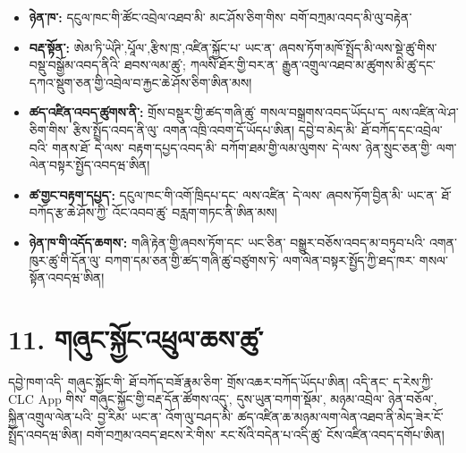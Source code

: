 \documentclass[11pt]{article}
\begin{document}
\begin{itemize}[leftmargin=*]
\item \textbf{ཉེན་ཁ་:} དངུལ་ཁང་གི་ཚོང་འབྲེལ་འཐབ་མི་ མང་ཤོས་ཅིག་གིས་ བགོ་བཀྲམ་འབད་མི་ལུ་བརྟེན་
\item \textbf{བརྡ་སྟོན་:} ཨེམ་ཏི་ཡེཊི་,པཱོལ་,རྩིས་ཁྲ་,འཛིན་སྐྱོང་པ་ ཡང་ན་ ཞབས་ཏོག་མཁོ་སྤྲོད་མི་ལས་སྡེ་ཚུ་གིས་ བསྡུ་བསྒྱོམ་འབད་ནིའི་ ཐབས་ལམ་ཚུ་; ཀལསི་ཐོར་གྱི་བར་ན་ རྒྱུན་འགྲུལ་འཐབ་མ་ཚུགས་མི་ཚུ་དང་ དཀའ་སྡུག་ཅན་གྱི་འབྲེལ་བ་རྐྱང་ཆེ་ཤོས་ཅིག་ཨིན་མས།
\item \textbf{ཚད་འཛིན་འབད་ཚུགས་ནི་:} གྲོས་བསྡུར་གྱི་ཚད་གཞི་ཚུ་ གསལ་བསྒྲགས་འབད་ཡོདཔ་ད་ ལས་འཛིན་ལེ་ཤ་ཅིག་གིས་ རྩིས་སྤྲོད་འབད་ནི་ལུ་ འགན་འཁྲི་འབག་དོ་ཡོདཔ་ཨིན། དབྱེ་བ་མེད་མི་ ཐོ་བཀོད་དང་འབྲེལ་བའི་ གནས་ཐོ་ དེ་ལས་ བརྟག་དཔྱད་འབད་མི་ བཀོག་ཐམ་གྱི་ལམ་ལུགས་ དེ་ལས་ ཉེན་སྲུང་ཅན་གྱི་ ལག་ལེན་བསྟར་སྤྱོད་འབདཝ་ཨིན།
\item \textbf{ཚ་གྱང་བརྟག་དཔྱད་:} དངུལ་ཁང་གི་འགོ་ཁྲིདཔ་དང་ ལས་འཛིན་ དེ་ལས་ ཞབས་ཏོག་བྱིན་མི་ ཡང་ན་ ཐོ་བཀོད་རྩ་ཆེ་ཤོས་ཀྱི་ འོང་འབབ་ཚུ་ བརླག་གཏང་ནི་ཨིན་མས།
\item \textbf{ཉེན་ཁ་གི་འདོད་ཆགས་:} གཞི་རྟེན་གྱི་ཞབས་ཏོག་དང་ ཡང་ཅིན་ བསྒྱུར་བཅོས་འབད་མ་བཏུབ་པའི་ འགན་ཁུར་ཚུ་གི་དོན་ལུ་ བཀག་དམ་ཅན་གྱི་ཚད་གཞི་ཚུ་བཙུགས་ཏེ་ ལག་ལེན་བསྟར་སྤྱོད་ཀྱི་ཐད་ཁར་ གསལ་སྟོན་འབདཝ་ཨིན།
\end{itemize}

\section*{11. གཞུང་སྐྱོང་འཕྲུལ་ཆས་ཚུ་}

དབྱེ་ཁག་འདི་ གཞུང་སྐྱོང་གི་ ཐོ་བཀོད་བཟོ་རྣམ་ཅིག་ གྲོས་འཆར་བཀོད་ཡོདཔ་ཨིན། འདི་ནང་ ད་རེས་ཀྱི་ CLC App གིས་ གཞུང་སྐྱོང་གྱི་བརྡ་དོན་ཚོགས་འདུ་, དུས་ཡུན་བཀག་སྡོམ་, མཉམ་འབྲེལ་ ཉེན་བཅོལ་, སྐྱིན་འགྲུལ་ལེན་པའི་ བྱ་རིམ་ ཡང་ན་ འོག་ལུ་བཤད་མི་ ཚད་འཛིན་ཆ་མཉམ་ལག་ལེན་འཐབ་ནི་མེད་ཟེར་ངོ་སྤྲོད་འབདཝ་ཨིན། བགོ་བཀྲམ་འབད་ཐངས་རེ་གིས་ རང་སོའི་བདེན་པ་འདི་ཚུ་ ངོས་འཛིན་འབད་དགོཔ་ཨིན།
\end{document}
